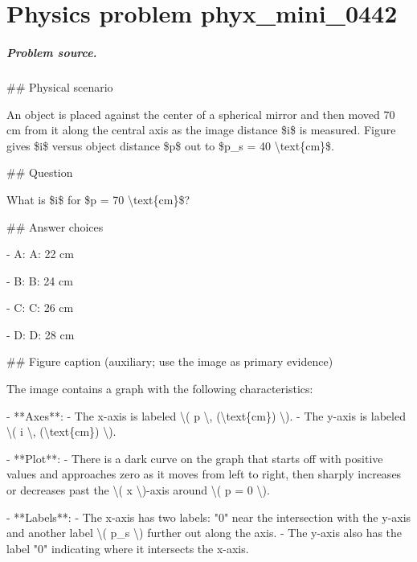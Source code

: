 
\chapter{Physics problem phyx\_mini\_0442}
\label{ch:PhyXMiniProblems_problem_phyx_mini_0442}

\paragraph{Problem source.}
\#\# Physical scenario

An object is placed against the center of a spherical mirror and then moved 70 cm from it along the central axis as the image distance \$i\$ is measured. Figure gives \$i\$ versus object distance \$p\$ out to \$p\_s = 40 \textbackslash{}text\{cm\}\$.

\#\# Question

What is \$i\$ for \$p = 70 \textbackslash{}text\{cm\}\$?

\#\# Answer choices

- A: A: 22 cm

- B: B: 24 cm

- C: C: 26 cm

- D: D: 28 cm

\#\# Figure caption (auxiliary; use the image as primary evidence)

The image contains a graph with the following characteristics:

- **Axes**: 
  - The x-axis is labeled \textbackslash{}( p \textbackslash{}, (\textbackslash{}text\{cm\}) \textbackslash{}).
  - The y-axis is labeled \textbackslash{}( i \textbackslash{}, (\textbackslash{}text\{cm\}) \textbackslash{}).

- **Plot**:
  - There is a dark curve on the graph that starts off with positive values and approaches zero as it moves from left to right, then sharply increases or decreases past the \textbackslash{}( x \textbackslash{})-axis around \textbackslash{}( p = 0 \textbackslash{}).

- **Labels**:
  - The x-axis has two labels: "0" near the intersection with the y-axis and another label \textbackslash{}( p\_s \textbackslash{}) further out along the axis.
  - The y-axis also has the label "0" indicating where it intersects the x-axis.
  
